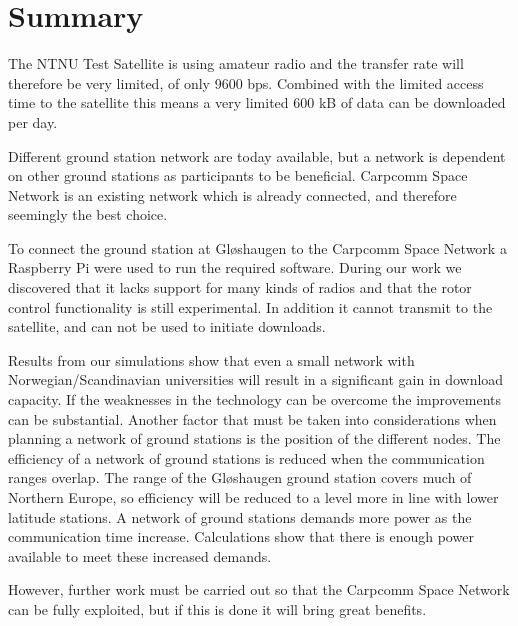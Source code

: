 \section{Summary}
The NTNU Test Satellite is using amateur radio and the transfer rate will therefore be very limited, of only 9600 bps. Combined with the limited access time to the satellite this means a very limited 600 kB of data can be downloaded per day. 

Different ground station network are today available, but a network is dependent on other ground stations as participants to be beneficial. Carpcomm Space Network is an existing network which is already connected, and therefore seemingly the best choice. 

To connect the ground station at Gløshaugen to the Carpcomm Space Network a Raspberry Pi were used to run the required software. During our work we discovered that it lacks support for many kinds of radios and that the rotor control functionality is still experimental. In addition it cannot transmit to the satellite, and can not be used to initiate downloads. 

Results from our simulations show that even a small network with Norwegian/Scandinavian universities will result in a significant gain in download capacity. If the weaknesses in the technology can be overcome the improvements can be substantial. Another factor that must be taken into considerations when planning a network of ground stations is the position of the different nodes. The efficiency of a network of ground stations is reduced when the communication ranges overlap. The range of the Gløshaugen ground station covers much of Northern Europe, so efficiency will be reduced to a level more in line with lower latitude stations. A network of ground stations demands more power as the communication time increase. Calculations show that there is enough power available to meet these increased demands.

However, further work must be carried out so that the Carpcomm Space Network can be fully exploited, but if this is done it will bring great benefits.